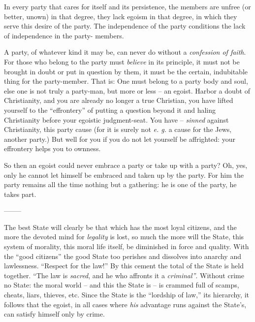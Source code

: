 \documentclass[12pt,a4paper]{book}
\begin{document}
In every party that cares for itself and its persistence, the members are 
unfree (or better, unown) in that degree, they lack egoism in that degree, in 
which they serve this desire of the party. The independence of the party 
conditions the lack of independence in the party- members.

A party, of whatever kind it may be, can never do without a \textit{confession 
of faith}. For those who belong to the party must \textit{believe} in its 
principle, it must not be brought in doubt or put in question by them, it must 
be the certain, indubitable thing for the party-member. That is: One must 
belong to a party body and soul, else one is not truly a party-man, but more 
or less -- an egoist. Harbor a doubt of Christianity, and you are already no 
longer a true Christian, you have lifted yourself to the ``effrontery'' of 
putting a question beyond it and haling Christianity before your egoistic 
judgment-seat. You have -- \textit{sinned} against Christianity, this party 
cause (for it is surely not \textit{e. g.} a cause for the Jews, another 
party.) But well for you if you do not let yourself be affrighted: your 
effrontery helps you to ownness.

So then an egoist could never embrace a party or take up with a party? Oh, 
yes, only he cannot let himself be embraced and taken up by the party. For him 
the party remains all the time nothing but a gathering: he is one of the 
party, he takes part.

\begin{center}
--------\end{center}


The best State will clearly be that which has the most loyal citizens, and the 
more the devoted mind for \textit{legality} is lost, so much the more will the 
State, this system of morality, this moral life itself, be diminished in force 
and quality. With the ``good citizens'' the good State too perishes and 
dissolves into anarchy and lawlessness. ``Respect for the law!'' By this 
cement the total of the State is held together. ``The law is \textit{sacred}, 
and he who affronts it a \textit{criminal''}. Without crime no State: the 
moral world -- and this the State is -- is crammed full of scamps, cheats, 
liars, thieves, etc. Since the State is the ``lordship of law,'' its 
hierarchy, it follows that the egoist, in all cases where \textit{his} 
advantage runs against the State's, can satisfy himself only by crime.
\end{document}
